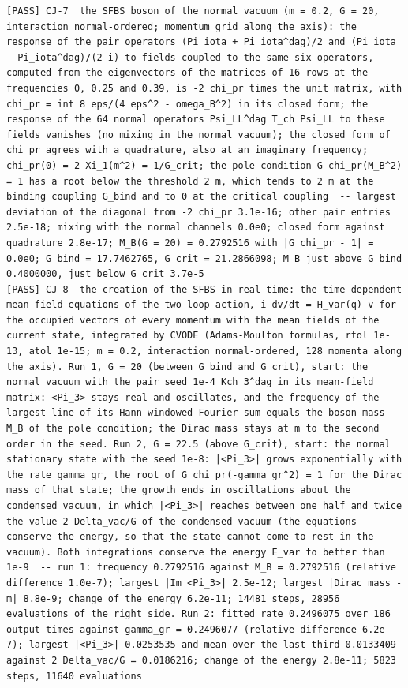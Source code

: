 \documentclass[
  10pt,
]{article}
\begin{document}
\begin{verbatim}
[PASS] CJ-7  the SFBS boson of the normal vacuum (m = 0.2, G = 20, interaction normal-ordered; momentum grid along the axis): the response of the pair operators (Pi_iota + Pi_iota^dag)/2 and (Pi_iota - Pi_iota^dag)/(2 i) to fields coupled to the same six operators, computed from the eigenvectors of the matrices of 16 rows at the frequencies 0, 0.25 and 0.39, is -2 chi_pr times the unit matrix, with chi_pr = int 8 eps/(4 eps^2 - omega_B^2) in its closed form; the response of the 64 normal operators Psi_LL^dag T_ch Psi_LL to these fields vanishes (no mixing in the normal vacuum); the closed form of chi_pr agrees with a quadrature, also at an imaginary frequency; chi_pr(0) = 2 Xi_1(m^2) = 1/G_crit; the pole condition G chi_pr(M_B^2) = 1 has a root below the threshold 2 m, which tends to 2 m at the binding coupling G_bind and to 0 at the critical coupling  -- largest deviation of the diagonal from -2 chi_pr 3.1e-16; other pair entries 2.5e-18; mixing with the normal channels 0.0e0; closed form against quadrature 2.8e-17; M_B(G = 20) = 0.2792516 with |G chi_pr - 1| = 0.0e0; G_bind = 17.7462765, G_crit = 21.2866098; M_B just above G_bind 0.4000000, just below G_crit 3.7e-5
[PASS] CJ-8  the creation of the SFBS in real time: the time-dependent mean-field equations of the two-loop action, i dv/dt = H_var(q) v for the occupied vectors of every momentum with the mean fields of the current state, integrated by CVODE (Adams-Moulton formulas, rtol 1e-13, atol 1e-15; m = 0.2, interaction normal-ordered, 128 momenta along the axis). Run 1, G = 20 (between G_bind and G_crit), start: the normal vacuum with the pair seed 1e-4 Kch_3^dag in its mean-field matrix: <Pi_3> stays real and oscillates, and the frequency of the largest line of its Hann-windowed Fourier sum equals the boson mass M_B of the pole condition; the Dirac mass stays at m to the second order in the seed. Run 2, G = 22.5 (above G_crit), start: the normal stationary state with the seed 1e-8: |<Pi_3>| grows exponentially with the rate gamma_gr, the root of G chi_pr(-gamma_gr^2) = 1 for the Dirac mass of that state; the growth ends in oscillations about the condensed vacuum, in which |<Pi_3>| reaches between one half and twice the value 2 Delta_vac/G of the condensed vacuum (the equations conserve the energy, so that the state cannot come to rest in the vacuum). Both integrations conserve the energy E_var to better than 1e-9  -- run 1: frequency 0.2792516 against M_B = 0.2792516 (relative difference 1.0e-7); largest |Im <Pi_3>| 2.5e-12; largest |Dirac mass - m| 8.8e-9; change of the energy 6.2e-11; 14481 steps, 28956 evaluations of the right side. Run 2: fitted rate 0.2496075 over 186 output times against gamma_gr = 0.2496077 (relative difference 6.2e-7); largest |<Pi_3>| 0.0253535 and mean over the last third 0.0133409 against 2 Delta_vac/G = 0.0186216; change of the energy 2.8e-11; 5823 steps, 11640 evaluations

\end{verbatim}
\end{document}
